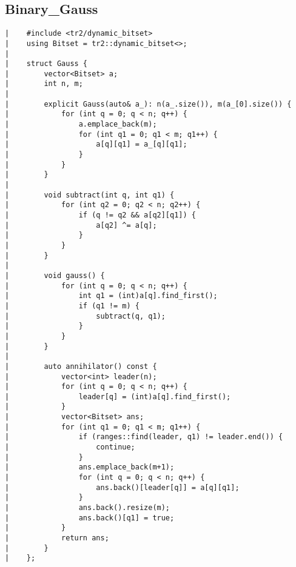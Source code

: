 \documentclass[a4paper, 10pt]{article}
\begin{document}
\begin{center}
\section*{Binary\_Gauss}
\begin{verbatim}
|    #include <tr2/dynamic_bitset>
|    using Bitset = tr2::dynamic_bitset<>;
|    
|    struct Gauss {
|        vector<Bitset> a;
|        int n, m;
|    
|        explicit Gauss(auto& a_): n(a_.size()), m(a_[0].size()) {
|            for (int q = 0; q < n; q++) {
|                a.emplace_back(m);
|                for (int q1 = 0; q1 < m; q1++) {
|                    a[q][q1] = a_[q][q1];
|                }
|            }
|        }
|    
|        void subtract(int q, int q1) {
|            for (int q2 = 0; q2 < n; q2++) {
|                if (q != q2 && a[q2][q1]) {
|                    a[q2] ^= a[q];
|                }
|            }
|        }
|    
|        void gauss() {
|            for (int q = 0; q < n; q++) {
|                int q1 = (int)a[q].find_first();
|                if (q1 != m) {
|                    subtract(q, q1);
|                }
|            }
|        }
|    
|        auto annihilator() const {
|            vector<int> leader(n);
|            for (int q = 0; q < n; q++) {
|                leader[q] = (int)a[q].find_first();
|            }
|            vector<Bitset> ans;
|            for (int q1 = 0; q1 < m; q1++) {
|                if (ranges::find(leader, q1) != leader.end()) {
|                    continue;
|                }
|                ans.emplace_back(m+1);
|                for (int q = 0; q < n; q++) {
|                    ans.back()[leader[q]] = a[q][q1];
|                }
|                ans.back().resize(m);
|                ans.back()[q1] = true;
|            }
|            return ans;
|        }
|    };
\end{verbatim}


\end{center}
\end{document}

